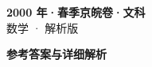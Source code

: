 \documentclass[zihao=-4, a4paper]{ctexart}
\begin{document}
\begin{center}
  {\Large\bfseries 2000 年·春季京皖卷·文科}\\[4pt]
  {\large 数学 · 解析版}
\end{center}
\medskip
{}

\clearpage
{}
\begin{center}{\Large\bfseries 参考答案与详细解析}\end{center}
\medskip

\end{document}
